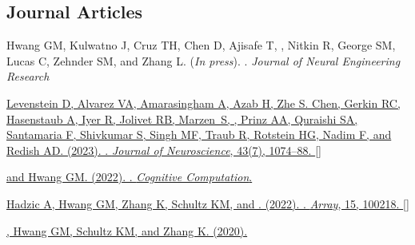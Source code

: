 

\subsection*{Journal Articles}
\label{sec:journalpubs}

\begin{description}
  \item Hwang GM, Kulwatno J, Cruz TH, Chen D, Ajisafe T, , Nitkin R, George SM, Lucas C, Zehnder SM, and Zhang L.
    (\emph{\color{lightred}In press}). .
    \emph{Journal of Neural Engineering Research}
  \item \href{https://doi.org/10.1523/JNEUROSCI.1179-22.2022}
    {Levenstein D, Alvarez VA, Amarasingham A, Azab H, Zhe S. Chen, Gerkin
      RC, Hasenstaub A, Iyer R, Jolivet RB, Marzen~S, , Prinz
      AA, Quraishi SA, Santamaria F, Shivkumar S, Singh MF, Traub R, Rotstein
      HG, Nadim F, and Redish AD. (2023). . \emph{Journal of Neuroscience}, 43(7), 1074--88.
    } []
  \item \href{https://dx.doi.org/10.1007/s12559-022-10081-9}
    { and Hwang GM. (2022). . \emph{Cognitive
    Computation}. }
  \item \href{https://doi.org/10.1016/j.array.2022.100218}{Hadzic
      A, Hwang GM, Zhang K, Schultz KM, and . (2022).
      . \emph{Array}, 15, 100218.
    }
    []\label{sec:hadzicpub}
  \item \href{https://dx.doi.org/10.1007/s00422-020-00823-z}
    {, Hwang GM, Schultz KM, and Zhang K. (2020).
      }
\end{description}
